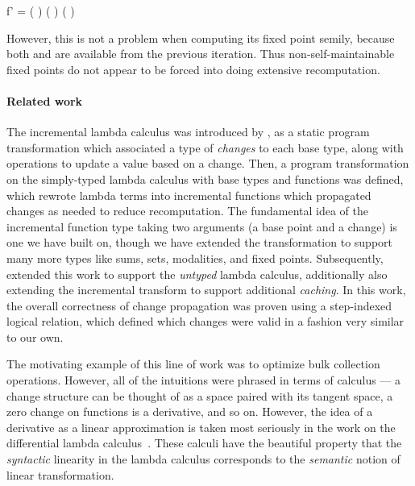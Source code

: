 \begin{code}
  f' \< \< =
  ( \relcomp {})
  \vee ( \relcomp {})
  \vee ( \relcomp {})
\end{code}

\noindent
However, this is not a problem when computing its fixed point semi\naive{}ly,
because both  and  are available from the previous
iteration. Thus non-self-maintainable fixed points do not appear to be forced
into doing extensive recomputation.



\paragraph{Related work}

The incremental lambda calculus was introduced by \citet{incremental},
as a static program transformation which associated a type of
\emph{changes} to each base type, along with operations to update a
value based on a change.  Then, a program transformation on the
simply-typed lambda calculus with base types and functions was
defined, which rewrote lambda terms into incremental functions which
propagated changes as needed to reduce recomputation. The fundamental
idea of the incremental function type taking two arguments (a base
point and a change) is one we have built on, though we have extended
the transformation to support many more types like sums, sets,
modalities, and fixed points.
%
Subsequently, \citet{DBLP:conf/esop/GiarrussoRS19} extended this work
to support the \emph{untyped} lambda calculus, additionally also
extending the incremental transform to support additional
\emph{caching}. In this work, the overall correctness of change
propagation was proven using a step-indexed logical relation, which
defined which changes were valid in a fashion very similar to our own.

The motivating example of this line of work was to optimize bulk collection
operations. However, all of the intuitions were phrased in terms of calculus ---
a change structure can be thought of as a space paired with its tangent space, a
zero change on functions is a derivative, and so on. However, the idea of a
derivative as a linear approximation is taken most seriously in the work on the
differential lambda calculus~\cite{dlc}. These calculi have the beautiful
property that the \emph{syntactic} linearity in the lambda calculus corresponds
to the \emph{semantic} notion of linear transformation.

